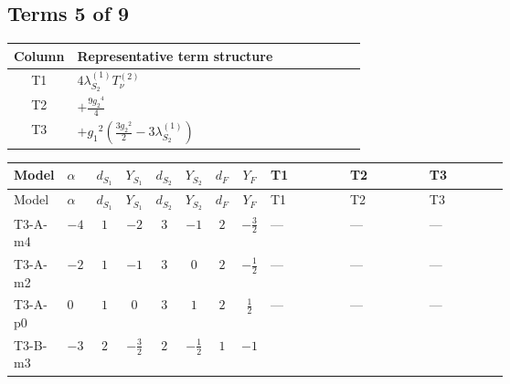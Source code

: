\documentclass[8pt]{article}
\begin{document}
\begin{landscape}
\subsection*{Terms 5 of 9}
\begin{center}
\begin{tabular}{@{}c >{\raggedright\arraybackslash}p{0.82\linewidth}@{}}
\toprule
Column & Representative term structure \\
\midrule
T1 & \(\displaystyle 4 {\lambda_{S_2}^{(1)}} T_{\nu}^{(2)}\) \\
\midrule
T2 & \(\displaystyle +\frac{9 {g_2}^4}{4}\) \\
\midrule
T3 & \(\displaystyle +{g_1}^2 \left(\frac{3 {g_2}^2}{2}-3 {\lambda_{S_2}^{(1)}}\right)\) \\
\midrule
\bottomrule
\end{tabular}
\end{center}
\smallskip
\tiny
\begin{longtable}{@{}llcccccc >{\raggedright\arraybackslash}p{0.21\linewidth} >{\raggedright\arraybackslash}p{0.21\linewidth} >{\raggedright\arraybackslash}p{0.21\linewidth}@{}}
\toprule
Model & $\alpha$ & $d_{S_1}$ & $Y_{S_1}$ & $d_{S_2}$ & $Y_{S_2}$ & $d_F$ & $Y_F$ & T1 & T2 & T3 \\
\midrule
\endfirsthead
\toprule
Model & $\alpha$ & $d_{S_1}$ & $Y_{S_1}$ & $d_{S_2}$ & $Y_{S_2}$ & $d_F$ & $Y_F$ & T1 & T2 & T3 \\
\midrule
\endhead
T3-A-m4 & $-4$ & $1$ & $-2$ & $3$ & $-1$ & $2$ & $-\frac{3}{2}$ & --- & --- & --- \\
\midrule
T3-A-m2 & $-2$ & $1$ & $-1$ & $3$ & $0$ & $2$ & $-\frac{1}{2}$ & --- & --- & --- \\
\midrule
T3-A-p0 & $0$ & $1$ & $0$ & $3$ & $1$ & $2$ & $\frac{1}{2}$ & --- & --- & --- \\
\midrule
T3-B-m3 & $-3$ & $2$ & $-\frac{3}{2}$ & $2$ & $-\frac{1}{2}$ & $1$ & $-1$ & \scriptsize\adjustbox{max width=\linewidth}{$\begin{gathered} 4 {\lambda_{S_2}^{(1)}} T_{\nu}^{(2)}\end{gathered}$} & \scriptsize\adjustbox{max width=\linewidth}{$\begin{gathered} +\frac{9 {g_2}^4}{4}\end{gathered}$} & \scriptsize\adjustbox{max width=\linewidth}{$\begin{gathered} +{g_1}^2 \left(\frac{3 {g_2}^2}{2}-3 {\lambda_{S_2}^{(1)}}\right)\end{gathered}$} \\

\end{longtable}
\end{landscape}
\end{document}
